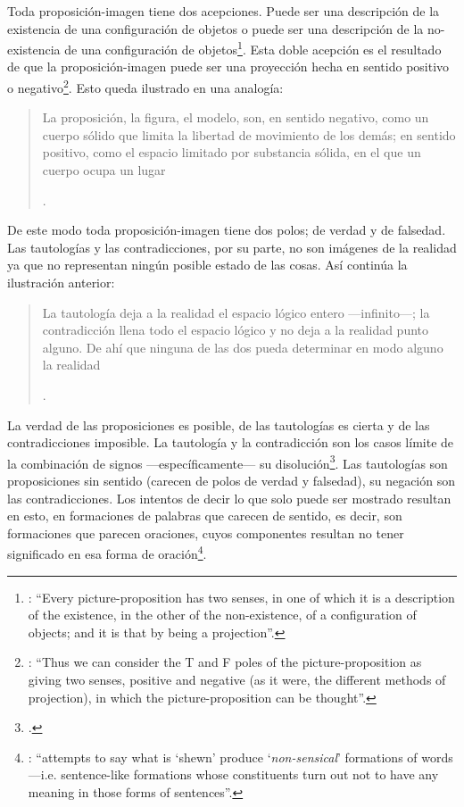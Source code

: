 Toda proposición-imagen tiene dos acepciones. Puede ser una descripción de la existencia de una configuración de objetos o puede ser una descripción de la no-existencia de una configuración de objetos\footnote{\cite[Cf.][72]{anscombe1959iwt}: \enquote{Every picture-proposition has two senses, in one of which it is a description of the existence, in the other of the non-existence, of a configuration of objects; and it is that by being a projection}.}. Esta doble acepción es el resultado de que la proposición-imagen puede ser una proyección hecha en sentido positivo o negativo\footnote{\cite[Cf.][74]{anscombe1959iwt}: \enquote{Thus we can consider the T and F poles of the picture-proposition as giving two senses, positive and negative (as it were, the different methods of projection), in which the picture-proposition can be thought}.}. Esto queda ilustrado en una analogía: \blockquote[{\Cite[\S4.463]{wittgenstein1922tractatuses}}.]{La proposición, la figura, el modelo, son, en sentido negativo, como un cuerpo sólido que limita la libertad de movimiento de los demás; en sentido positivo, como el espacio limitado por substancia sólida, en el que un cuerpo ocupa un lugar}.

De este modo toda proposición-imagen tiene dos polos; de verdad y de falsedad. Las tautologías y las contradicciones, por su parte, no son imágenes de la realidad ya que no representan ningún posible estado de las cosas. Así continúa la ilustración anterior:
\blockquote[{\Cite[\S4.463]{wittgenstein1922tractatuses}}.]{La tautología deja a la realidad el espacio lógico entero ---infinito---; la contradicción llena todo el espacio lógico y no deja a la realidad punto alguno. De ahí que ninguna de las dos pueda determinar en modo alguno la realidad}.

La verdad de las proposiciones es posible, de las tautologías es cierta y de las contradicciones imposible. La tautología y la contradicción son los casos límite de la combinación de signos ---específicamente--- su disolución\footcite[Cf.][\S4.464 y \S4.466]{wittgenstein1922tractatuses}. Las tautologías son proposiciones sin sentido (carecen de polos de verdad y falsedad), su negación son las contradicciones. Los intentos de decir lo que solo puede ser mostrado resultan en esto, en formaciones de palabras que carecen de sentido, es decir, son formaciones que parecen oraciones, cuyos componentes resultan no tener significado en esa forma de oración\footnote{\cite[Cf.][163]{anscombe1959iwt}: \enquote{attempts to say what is `shewn' produce `\emph{non-sensical}' formations of words---i.e. sentence-like formations whose constituents turn out not to have any meaning in those forms of sentences}.}.

